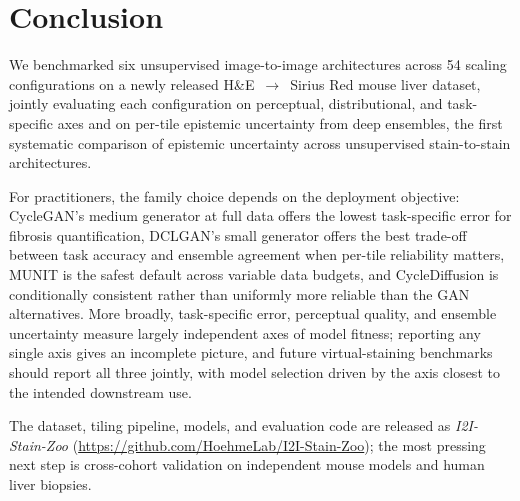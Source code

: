 
\section{Conclusion}
\label{sec:conclusion}

We benchmarked six unsupervised image-to-image architectures across 54 scaling
configurations on a newly released H\&E~$\to$~Sirius Red mouse liver dataset, jointly
evaluating each configuration on perceptual, distributional, and task-specific axes and
on per-tile epistemic uncertainty from deep ensembles, the first systematic comparison
of epistemic uncertainty across unsupervised stain-to-stain architectures.

For practitioners, the family choice depends on the deployment objective: CycleGAN's
medium generator at full data offers the lowest task-specific error for fibrosis
quantification, DCLGAN's small generator offers the best trade-off between task
accuracy and ensemble agreement when per-tile reliability matters, MUNIT is the safest
default across variable data budgets, and CycleDiffusion is conditionally consistent
rather than uniformly more reliable than the GAN alternatives. More broadly,
task-specific error, perceptual quality, and ensemble uncertainty measure largely
independent axes of model fitness; reporting any single axis gives an incomplete
picture, and future virtual-staining benchmarks should report all three jointly, with
model selection driven by the axis closest to the intended downstream use.

The dataset, tiling pipeline, models, and evaluation code are released as
\textit{I2I-Stain-Zoo} (\url{https://github.com/HoehmeLab/I2I-Stain-Zoo}); the most pressing
next step is cross-cohort validation on independent mouse models and human liver
biopsies.

